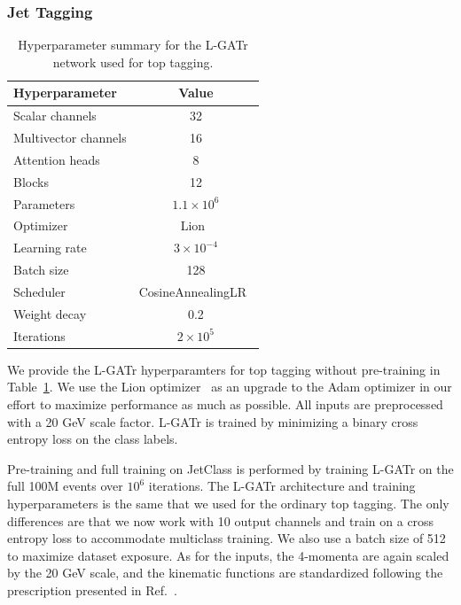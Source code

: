 \documentclass[submission, Phys]{SciPost}
\begin{document}
\subsubsection*{Jet Tagging}

\begin{table}[t]
    \centering
    \begin{tabular}{l c }
        \toprule
        Hyperparameter & Value\\[1mm]
        \midrule
        Scalar channels & 32 \\
        Multivector channels & 16 \\
        Attention heads & 8 \\
        Blocks & 12 \\        
        Parameters & $1.1 \times 10^6$\\
        \midrule
        Optimizer & Lion~\cite{chen2023symbolic} \\
        Learning rate & $3 \times 10^{-4}$ \\
        Batch size & 128 \\
        Scheduler & CosineAnnealingLR~\cite{DBLP:journals/corr/LoshchilovH16a} \\
        Weight decay & 0.2 \\      
        Iterations & $2 \times 10^5$\\
        \bottomrule
    \end{tabular}
    \caption{Hyperparameter summary for the L-GATr network used for top tagging.} 
    \label{tab:top_build}
\end{table}

We provide the L-GATr hyperparamters for top tagging without pre-training in Table~\ref{tab:top_build}. We use the Lion optimizer~\cite{chen2023symbolic} as an upgrade to the Adam optimizer in our effort to maximize performance as much as possible. All inputs are preprocessed with a 20 GeV scale factor. L-GATr is trained by minimizing a binary cross entropy loss on the class labels.

Pre-training and full training on JetClass is performed by training L-GATr on the full 100M events over $10^6$ iterations. The L-GATr architecture and training hyperparameters is the same that we used for the ordinary top tagging. The only differences are that we now work with 10 output channels and train on a cross entropy loss to accommodate multiclass training. We also use a batch size of 512 to maximize dataset exposure. As for the inputs, the 4-momenta are again scaled by the 20 GeV scale, and the kinematic functions are standardized following the prescription presented in Ref.~\cite{Qu:2022mxj}.
\end{document}

